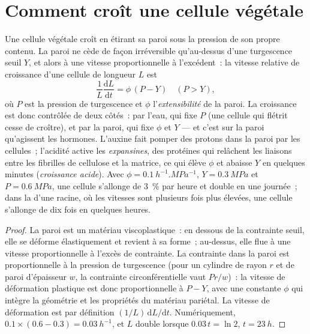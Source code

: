 \section{Comment croît une cellule végétale}

\begin{theorem}\label{thm:b2:plant-meristems:lockhart}
Une cellule végétale croît en étirant sa paroi sous la pression de son
propre contenu. La paroi ne cède de façon irréversible qu'au-dessus
d'une turgescence seuil $Y$, et alors à une vitesse proportionnelle à
l'excédent~: la vitesse relative de croissance d'une cellule de longueur
$L$ est
\[
\frac{1}{L}\frac{\mathrm{d}L}{\mathrm{d}t} = \phi\,(P - Y) \quad (P > Y),
\]
où $P$ est la pression de turgescence et $\phi$ l'\emph{extensibilité}
de la paroi. La croissance est donc contrôlée de deux côtés~: par l'eau,
qui fixe $P$ (une cellule qui flétrit cesse de croître), et par la
paroi, qui fixe $\phi$ et $Y$ --- et c'est sur la paroi qu'agissent les
hormones. L'auxine fait pomper des protons dans la paroi par les
cellules~; l'acidité active les \emph{expansines}, des protéines qui
relâchent les liaisons entre les fibrilles de cellulose et la matrice,
ce qui élève $\phi$ et abaisse $Y$ en quelques minutes (\emph{croissance
acide}). Avec $\phi =
\qty{0.1}{h^{-1}.MPa^{-1}}$, $Y = \qty{0.3}{MPa}$ et $P =
\qty{0.6}{MPa}$, une cellule s'allonge de \qty{3}{\%} par heure et
double en une journée~; dans la  d'une racine, où les
vitesses sont plusieurs fois plus élevées, une cellule s'allonge de dix
fois en quelques heures.
\end{theorem}
\begin{proof}
La paroi est un matériau viscoplastique~: en dessous de la contrainte
seuil, elle se déforme élastiquement et revient à sa forme~; au-dessus,
elle flue à une vitesse proportionnelle à l'excès de contrainte. La
contrainte dans la paroi est proportionnelle à la pression de
turgescence (pour un cylindre de rayon $r$ et de paroi d'épaisseur $w$,
la contrainte circonférentielle vaut $Pr/w$)~: la vitesse de
déformation plastique est donc proportionnelle à $P - Y$, avec une
constante $\phi$ qui intègre la géométrie et les propriétés du matériau
pariétal. La vitesse de déformation est par définition
$(1/L)\,\mathrm{d}L/\mathrm{d}t$. Numériquement,
$0.1\times(0.6 - 0.3) = \qty{0.03}{h^{-1}}$, et $L$ double lorsque
$0.03\,t = \ln 2$, $t = \qty{23}{h}$.
\end{proof}

